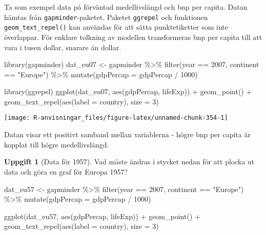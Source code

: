 \documentclass[
]{book}
\newenvironment{Shaded}{\begin{snugshade}}{\end{snugshade}}
\newcommand{\AttributeTok}[1]{\textcolor[rgb]{0.77,0.63,0.00}{#1}}
\newcommand{\DecValTok}[1]{\textcolor[rgb]{0.00,0.00,0.81}{#1}}
\newcommand{\FunctionTok}[1]{\textcolor[rgb]{0.00,0.00,0.00}{#1}}
\newcommand{\NormalTok}[1]{#1}
\newcommand{\OtherTok}[1]{\textcolor[rgb]{0.56,0.35,0.01}{#1}}
\newcommand{\SpecialCharTok}[1]{\textcolor[rgb]{0.00,0.00,0.00}{#1}}
\newcommand{\StringTok}[1]{\textcolor[rgb]{0.31,0.60,0.02}{#1}}
\theoremstyle{definition}
\theoremstyle{definition}
\theoremstyle{definition}
\newtheorem{exercise}{Uppgift}[chapter]
\theoremstyle{definition}
\theoremstyle{remark}
\begin{document}
Ta som exempel data på förväntad medellivslängd och bnp per capita. Datan hämtas från \texttt{gapminder}-paketet. Paketet \texttt{ggrepel} och funktionen \texttt{geom\_text\_repel()} kan användas för att sätta punktetiketter som inte överlappar. För enklare tolkning av modellen transformeras bnp per capita till att vara i tusen dollar, snarare än dollar.

\begin{Shaded}
\begin{Highlighting}[]
\FunctionTok{library}\NormalTok{(gapminder)}
\NormalTok{dat\_eu07 }\OtherTok{\textless{}{-}}\NormalTok{ gapminder }\SpecialCharTok{\%\textgreater{}\%} 
  \FunctionTok{filter}\NormalTok{(year }\SpecialCharTok{==} \DecValTok{2007}\NormalTok{, continent }\SpecialCharTok{==} \StringTok{"Europe"}\NormalTok{) }\SpecialCharTok{\%\textgreater{}\%} 
  \FunctionTok{mutate}\NormalTok{(}\AttributeTok{gdpPercap =}\NormalTok{ gdpPercap }\SpecialCharTok{/} \DecValTok{1000}\NormalTok{)}

\FunctionTok{library}\NormalTok{(ggrepel)}
\FunctionTok{ggplot}\NormalTok{(dat\_eu07, }\FunctionTok{aes}\NormalTok{(gdpPercap, lifeExp)) }\SpecialCharTok{+}
  \FunctionTok{geom\_point}\NormalTok{() }\SpecialCharTok{+}
  \FunctionTok{geom\_text\_repel}\NormalTok{(}\FunctionTok{aes}\NormalTok{(}\AttributeTok{label =}\NormalTok{ country), }\AttributeTok{size =} \DecValTok{3}\NormalTok{)}
\end{Highlighting}
\end{Shaded}

\begin{center}\texttt{[image: R-anvisningar\_files/figure-latex/unnamed-chunk-354-1]} \end{center}

Datan visar ett positivt samband mellan variablerna - högre bnp per capita är kopplat till högre medellivslängd.

\begin{exercise}[Data för 1957]

Vad måste ändras i stycket nedan för att plocka ut data och göra en graf för Europa 1957?

\begin{Shaded}
\begin{Highlighting}[]
\NormalTok{dat\_eu57 }\OtherTok{\textless{}{-}}\NormalTok{ gapminder }\SpecialCharTok{\%\textgreater{}\%} 
  \FunctionTok{filter}\NormalTok{(year }\SpecialCharTok{==} \DecValTok{2007}\NormalTok{, continent }\SpecialCharTok{==} \StringTok{"Europe"}\NormalTok{) }\SpecialCharTok{\%\textgreater{}\%} 
  \FunctionTok{mutate}\NormalTok{(}\AttributeTok{gdpPercap =}\NormalTok{ gdpPercap }\SpecialCharTok{/} \DecValTok{1000}\NormalTok{)}

\FunctionTok{ggplot}\NormalTok{(dat\_eu57, }\FunctionTok{aes}\NormalTok{(gdpPercap, lifeExp)) }\SpecialCharTok{+}
  \FunctionTok{geom\_point}\NormalTok{() }\SpecialCharTok{+}
  \FunctionTok{geom\_text\_repel}\NormalTok{(}\FunctionTok{aes}\NormalTok{(}\AttributeTok{label =}\NormalTok{ country), }\AttributeTok{size =} \DecValTok{3}\NormalTok{)}
\end{Highlighting}
\end{Shaded}

\end{exercise}
\end{document}
